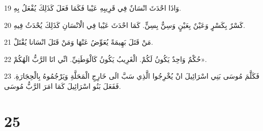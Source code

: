 \par 19 وَاذَا احْدَثَ انْسَانٌ فِي قَرِيبِهِ عَيْبا فَكَمَا فَعَلَ كَذَلِكَ يُفْعَلُ بِهِ.
\par 20 كَسْرٌ بِكَسْرٍ وَعَيْنٌ بِعَيْنٍ وَسِنٌّ بِسِنٍّ. كَمَا احْدَثَ عَيْبا فِي الْانْسَانِ كَذَلِكَ يُحْدَثُ فِيهِ.
\par 21 مَنْ قَتَلَ بَهِيمَةً يُعَوِّضُ عَنْهَا وَمَنْ قَتَلَ انْسَانا يُقْتَلْ.
\par 22 حُكْمٌ وَاحِدٌ يَكُونُ لَكُمْ. الْغَرِيبُ يَكُونُ كَالْوَطَنِيِّ. انِّي انَا الرَّبُّ الَهُكُمْ».
\par 23 فَكَلَّمَ مُوسَى بَنِي اسْرَائِيلَ انْ يُخْرِجُوا الَّذِي سَبَّ الَى خَارِجِ الْمَحَلَّةِ وَيَرْجُمُوهُ بِالْحِجَارَةِ. فَفَعَلَ بَنُو اسْرَائِيلَ كَمَا امَرَ الرَّبُّ مُوسَى.

\chapter{25}

